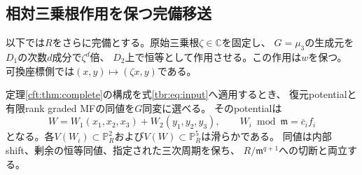 \subsection{相対三乗根作用を保つ完備移送}

以下では$R$をさらに完備とする。原始三乗根$\zeta\in\mathbb C$を固定し、
$G=\mu_3$の生成元を$D_1$の次数$d$成分で$\zeta^d$倍、
$D_2$上で恒等として作用させる。この作用は$w$を保つ。
可換座標側では$(x,y)\mapsto(\zeta x,y)$である。

\begin{proposition}[完備復元potentialの二ブロック分解]
\label{tbr:prop:complete-split}
定理\ref{cft:thm:complete}の構成を式\eqref{tbr:eq:input}へ適用するとき、
復元potentialと有限rank graded MFの同値を$G$同変に選べる。
そのpotentialは
\begin{equation}\label{tbr:eq:split-potential}
 W=W_1(x_1,x_2,x_3)+W_2(y_1,y_2,y_3),\qquad
 W_i\bmod\mathfrak m=\overline c_i f_i
\end{equation}
となる。各$V(W_i)\subset\mathbb P^2_R$および$V(W)\subset\mathbb P^5_R$は滑らかである。
同値は内部shift、剰余の恒等同値、指定された三次周期を保ち、
$R/\mathfrak m^{q+1}$への切断と両立する。
\end{proposition}
